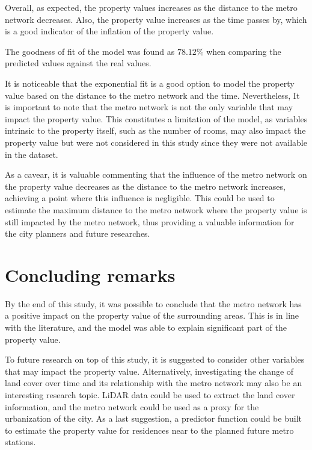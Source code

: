 \documentclass[12pt]{gsis} %
\begin{document}
Overall, as expected, the property values increases as the distance to the metro network decreases.
Also, the property value increases as the time passes by, which is a good indicator of the inflation of the property value.

The goodness of fit of the model was found as $78.12\%$ when comparing the predicted values against the real values.

It is noticeable that the exponential fit is a good option to model the property value based on the distance to the metro network and the time.
Nevertheless, It is important to note that the metro network is not the only variable that may impact the property value.
This constitutes a limitation of the model, as variables intrinsic to the property itself, such as the number of rooms, may also impact the property value but were not considered in this study since they were not available in the dataset.

As a cavear, it is valuable commenting that the influence of the metro network on the property value decreases as the distance to the metro network increases, achieving a point where this influence is negligible.
This could be used to estimate the maximum distance to the metro network where the property value is still impacted by the metro network, thus providing a valuable information for the city planners and future researches.

\section{Concluding remarks}

By the end of this study, it was possible to conclude that the metro network has a positive impact on the property value of the surrounding areas.
This is in line with the literature, and the model was able to explain significant part of the property value.

To future research on top of this study, it is suggested to consider other variables that may impact the property value.
Alternatively, investigating the change of land cover over time and its relationship with the metro network may also be an interesting research topic.
LiDAR data could be used to extract the land cover information, and the metro network could be used as a proxy for the urbanization of the city.
As a last suggestion, a predictor function could be built to estimate the property value for residences near to the planned future metro stations.
\end{document}

